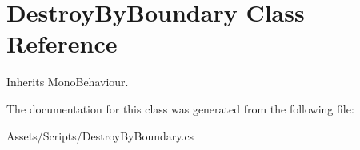 \hypertarget{class_destroy_by_boundary}{}\section{Destroy\+By\+Boundary Class Reference}
\label{class_destroy_by_boundary}


Inherits Mono\+Behaviour.



The documentation for this class was generated from the following file\+:\begin{DoxyCompactItemize}
\item 
Assets/\+Scripts/Destroy\+By\+Boundary.\+cs\end{DoxyCompactItemize}
